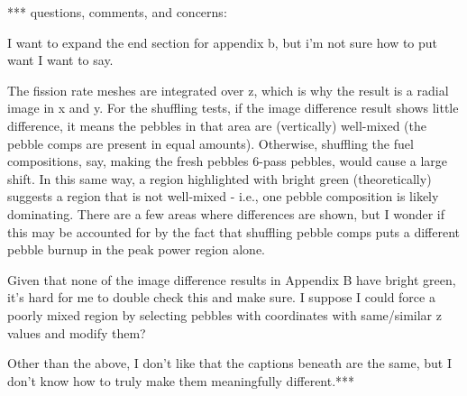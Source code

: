 *** questions, comments, and concerns:

I want to expand the end section for appendix b, but i'm not sure how to put want I want to say.

The fission rate meshes are integrated over z, which is why the result is a radial image in x and y.  For the shuffling tests, if the image difference result shows little difference, it means the pebbles in that area are (vertically) well-mixed (the pebble comps are present in equal amounts).  Otherwise, shuffling the fuel compositions, say, making the fresh pebbles 6-pass pebbles, would cause a large shift.  In this same way, a region highlighted with bright green (theoretically) suggests a region that is not well-mixed - i.e., one pebble composition is likely dominating.  There are a few areas where differences are shown, but I wonder if this may be accounted for by the fact that shuffling pebble comps puts a different pebble burnup in the peak power region alone.

Given that none of the image difference results in Appendix B have bright green, it's hard for me to double check this and make sure.  I suppose I could force a poorly mixed region by selecting pebbles with coordinates with same/similar z values and modify them?

Other than the above, I don't like that the captions beneath are the same, but I don't know how to truly make them meaningfully different.***